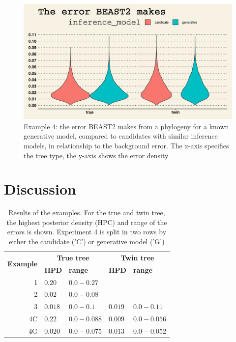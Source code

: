 \documentclass{article}
\begin{document}
\begin{figure}[h]
  \includegraphics[width=\textwidth]{figure_example_4.png}
  \caption{
    Example 4: the error BEAST2 makes from a phylogeny for a known
    generative model, compared to candidates with similar inference models,
    in relationship to the background error.
    The x-axis specifies the tree type,
    the y-axis shows the error density
  }
  \label{fig:example_4}
\end{figure}

\section{Discussion}

\begin{table}[h]
\centering
\begin{tabular}{ | r | l | l | l | l | }
\hline
\multirow{2}{*}{\textbf{Example}} & \multicolumn{2}{c|}{\textbf{True tree}} 
                                  & \multicolumn{2}{c|}{\textbf{Twin tree}} \\
\cline{2-5}
                                  & \textbf{HPD} & \textbf{range} & \textbf{HPD} & \textbf{range} \\
\hline
1  & $0.20$  & $0.0 - 0.27$  &         &               \\
2  & $0.02$  & $0.0 - 0.08$  &         &               \\
3  & $0.018$ & $0.0 - 0.1$   & $0.019$ & $0.0 - 0.11$  \\
4C & $0.22$  & $0.0 - 0.088$ & $0.009$ & $0.0 - 0.056$ \\
4G & $0.020$ & $0.0 - 0.075$ & $0.013$ & $0.0 - 0.052$ \\
\hline
\end{tabular}
\caption{Results of the examples. For the true and twin tree,
  the highest posterior density (HPC) and range of the errors 
  is shown. Experiment 4 is split in two rows
  by either the candidate ('C') or generative model ('G') 
}
\label{tab:results}
\end{table}
\end{document}
